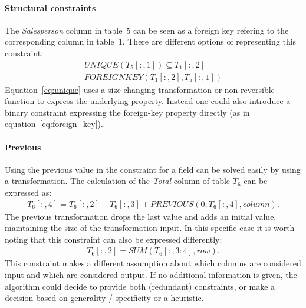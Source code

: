\documentclass[a4paper]{article}
\newcommand{\range}[3]{#1[#2,#3]}
\newcommand{\rangeto}[2]{#1{:}#2}
\newcommand{\rangeall}{:}
\begin{document}
\paragraph{Structural constraints}
The \textit{Salesperson} column in table~5 can be seen as a foreign key refering to the corresponding column in table~1.
There are different options of representing this constraint:
\begin{align}
	\mathit{UNIQUE}(\range{T_5}{\rangeall}{1}) \subseteq \range{T_1}{\rangeall}{2} \label{eq:unique}\\
	\mathit{FOREIGNKEY}(\range{T_1}{\rangeall}{2}, \range{T_5}{\rangeall}{1}) \label{eq:foreign_key}
\end{align}
Equation~\ref{eq:unique} uses a size-changing transformation or non-reversible function to express the underlying property.
Instead one could also introduce a binary constraint expressing the foreign-key property directly (as in equation~\ref{eq:foreign_key}).

\paragraph{Previous} Using the previous value in the constraint for a field can be solved easily by using a transformation.
The calculation of the \textit{Total} column of table $T_6$ can be expressed as:
\begin{align}
	\range{T_6}{\rangeall}{4} = \range{T_6}{\rangeall}{2} - \range{T_6}{\rangeall}{3} + \mathit{PREVIOUS}(0, \range{T_6}{\rangeall}{4}, column).
\end{align}
The previous transformation drops the last value and adds an initial value, maintaining the size of the transformation input.
In this specific case it is worth noting that this constraint can also be expressed differently:
\begin{align}
	\range{T_6}{\rangeall}{2} = \mathit{SUM}(\range{T_6}{\rangeall}{\rangeto{3}{4}}, row).
\end{align}
This constraint makes a different assumption about which columns are considered input and which are considered output.
If no additional information is given, the algorithm could decide to provide both (redundant) constraints, or make a decision based on generality / specificity or a heuristic.
\end{document}
